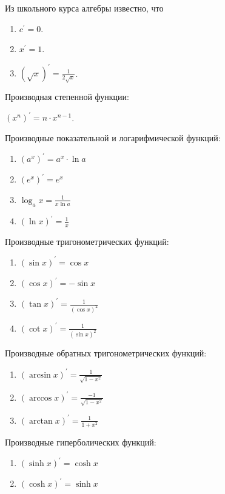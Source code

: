 \documentclass[a4paper,fontsize=16pt]{article}
\begin{document}
Из школьного курса алгебры известно, что

\begin{enumerate}
\item $c^\prime = 0$.
\item $x^\prime = 1$.
\item $(\sqrt{x})^\prime = \frac{1}{2\sqrt{x}}$.
\end{enumerate}


Производная степенной функции:

$(x^n)^\prime = n \cdot x^{n-1}$.
\vspace{0.5cm}

Производные показательной и логарифмической функций:

\begin{enumerate}
\item $(a^x)^\prime = a^x \cdot \ln{a}$
\item $(e^x)^\prime = e^x$
\item $\log_{a}{x} = \frac{1}{x\ln{a}}$
\item $(\ln{x})^\prime = \frac{1}{x}$
\end{enumerate}


Производные тригонометрических функций:

\begin{enumerate}
\item $(\sin{x})^\prime = \cos{x}$
\item $(\cos{x})^\prime = -\sin{x}$
\item $(\tan{x})^\prime = \frac{1}{(\cos{x})^2}$
\item $(\cot{x})^\prime = \frac{1}{(\sin{x})^2}$
\end{enumerate}


Производные обратных тригонометрических функций:

\begin{enumerate}
\item $(\arcsin{x})^\prime = \frac{1}{\sqrt{1 - x^2}}$
\item $(\arccos{x})^\prime = \frac{-1}{\sqrt{1 - x^2}}$
\item $(\arctan{x})^\prime = \frac{1}{1 + x^2}$
\end{enumerate}


Производные гиперболических функций:

\begin{enumerate}
\item $(\sinh{x})^\prime = \cosh{x}$
\item $(\cosh{x})^\prime = \sinh{x}$
\end{enumerate}
\end{document}
